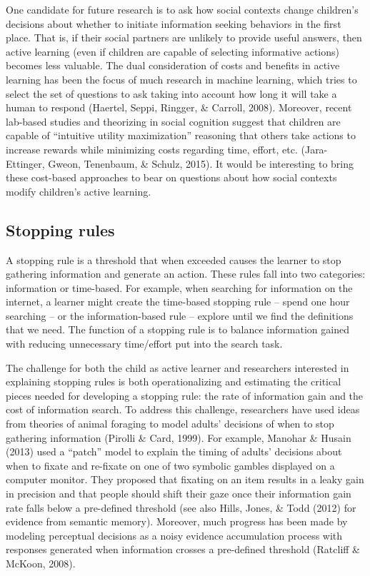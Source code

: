\documentclass[oneside]{report}
\begin{document}
One candidate for future research is to ask how social contexts change
children's decisions about whether to initiate information seeking
behaviors in the first place. That is, if their social partners are
unlikely to provide useful answers, then active learning (even if
children are capable of selecting informative actions) becomes less
valuable. The dual consideration of costs and benefits in active
learning has been the focus of much research in machine learning, which
tries to select the set of questions to ask taking into account how long
it will take a human to respond (Haertel, Seppi, Ringger, \& Carroll,
2008). Moreover, recent lab-based studies and theorizing in social
cognition suggest that children are capable of ``intuitive utility
maximization'' reasoning that others take actions to increase rewards
while minimizing costs regarding time, effort, etc. (Jara-Ettinger,
Gweon, Tenenbaum, \& Schulz, 2015). It would be interesting to bring
these cost-based approaches to bear on questions about how social
contexts modify children's active learning.

\subsection{Stopping rules}\label{stopping-rules}

A stopping rule is a threshold that when exceeded causes the learner to
stop gathering information and generate an action. These rules fall into
two categories: information or time-based. For example, when searching
for information on the internet, a learner might create the time-based
stopping rule -- spend one hour searching -- or the information-based
rule -- explore until we find the definitions that we need. The function
of a stopping rule is to balance information gained with reducing
unnecessary time/effort put into the search task.

The challenge for both the child as active learner and researchers
interested in explaining stopping rules is both operationalizing and
estimating the critical pieces needed for developing a stopping rule:
the rate of information gain and the cost of information search. To
address this challenge, researchers have used ideas from theories of
animal foraging to model adults' decisions of when to stop gathering
information (Pirolli \& Card, 1999). For example, Manohar \& Husain
(2013) used a ``patch'' model to explain the timing of adults' decisions
about when to fixate and re-fixate on one of two symbolic gambles
displayed on a computer monitor. They proposed that fixating on an item
results in a leaky gain in precision and that people should shift their
gaze once their information gain rate falls below a pre-defined
threshold (see also Hills, Jones, \& Todd (2012) for evidence from
semantic memory). Moreover, much progress has been made by modeling
perceptual decisions as a noisy evidence accumulation process with
responses generated when information crosses a pre-defined threshold
(Ratcliff \& McKoon, 2008).
\end{document}
